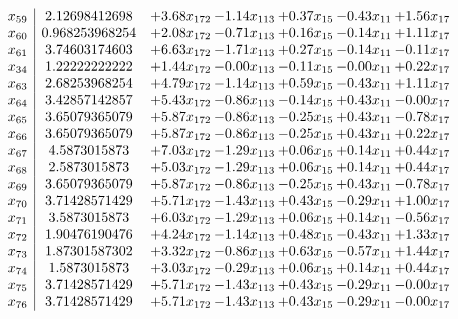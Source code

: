 \documentclass[8pt]{article}
\begin{document}
\[\begin{array}{c| c c@{\hskip 2pt} c@{\hskip 2pt} c@{\hskip 2pt} c@{\hskip 2pt} c@{\hskip 2pt} }
 x_{59}   &  2.12698412698 & +  3.68 x_{172} & -1.14 x_{113} & +  0.37 x_{15} & -0.43 x_{11} & +  1.56 x_{17}\\
 x_{60}   &  0.968253968254 & +  2.08 x_{172} & -0.71 x_{113} & +  0.16 x_{15} & -0.14 x_{11} & +  1.11 x_{17}\\
 x_{61}   &  3.74603174603 & +  6.63 x_{172} & -1.71 x_{113} & +  0.27 x_{15} & -0.14 x_{11} & -0.11 x_{17}\\
 x_{34}   &  1.22222222222 & +  1.44 x_{172} & -0.00 x_{113} & -0.11 x_{15} & -0.00 x_{11} & +  0.22 x_{17}\\
 x_{63}   &  2.68253968254 & +  4.79 x_{172} & -1.14 x_{113} & +  0.59 x_{15} & -0.43 x_{11} & +  1.11 x_{17}\\
 x_{64}   &  3.42857142857 & +  5.43 x_{172} & -0.86 x_{113} & -0.14 x_{15} & +  0.43 x_{11} & -0.00 x_{17}\\
 x_{65}   &  3.65079365079 & +  5.87 x_{172} & -0.86 x_{113} & -0.25 x_{15} & +  0.43 x_{11} & -0.78 x_{17}\\
 x_{66}   &  3.65079365079 & +  5.87 x_{172} & -0.86 x_{113} & -0.25 x_{15} & +  0.43 x_{11} & +  0.22 x_{17}\\
 x_{67}   &  4.5873015873 & +  7.03 x_{172} & -1.29 x_{113} & +  0.06 x_{15} & +  0.14 x_{11} & +  0.44 x_{17}\\
 x_{68}   &  2.5873015873 & +  5.03 x_{172} & -1.29 x_{113} & +  0.06 x_{15} & +  0.14 x_{11} & +  0.44 x_{17}\\
 x_{69}   &  3.65079365079 & +  5.87 x_{172} & -0.86 x_{113} & -0.25 x_{15} & +  0.43 x_{11} & -0.78 x_{17}\\
 x_{70}   &  3.71428571429 & +  5.71 x_{172} & -1.43 x_{113} & +  0.43 x_{15} & -0.29 x_{11} & +  1.00 x_{17}\\
 x_{71}   &  3.5873015873 & +  6.03 x_{172} & -1.29 x_{113} & +  0.06 x_{15} & +  0.14 x_{11} & -0.56 x_{17}\\
 x_{72}   &  1.90476190476 & +  4.24 x_{172} & -1.14 x_{113} & +  0.48 x_{15} & -0.43 x_{11} & +  1.33 x_{17}\\
 x_{73}   &  1.87301587302 & +  3.32 x_{172} & -0.86 x_{113} & +  0.63 x_{15} & -0.57 x_{11} & +  1.44 x_{17}\\
 x_{74}   &  1.5873015873 & +  3.03 x_{172} & -0.29 x_{113} & +  0.06 x_{15} & +  0.14 x_{11} & +  0.44 x_{17}\\
 x_{75}   &  3.71428571429 & +  5.71 x_{172} & -1.43 x_{113} & +  0.43 x_{15} & -0.29 x_{11} & -0.00 x_{17}\\
 x_{76}   &  3.71428571429 & +  5.71 x_{172} & -1.43 x_{113} & +  0.43 x_{15} & -0.29 x_{11} & -0.00 x_{17}\\

\end{array}\]
\end{document}
